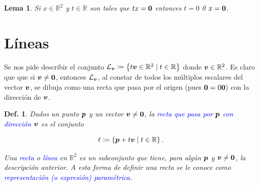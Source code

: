 \documentclass{article}
\theoremstyle{definicion}
\newtheorem{definicion}{Def.}
\theoremstyle{definition}             %
\theoremstyle{definition}             %
\theoremstyle{definition}
\theoremstyle{definition}
\theoremstyle{observacion}
\theoremstyle{definition}
\theoremstyle{plain}
\newtheorem{lemma}{Lema}
\theoremstyle{definition}
\theoremstyle{afirmacion}
\theoremstyle{notation}
\theoremstyle{definition}
\begin{document}
    \begin{lemma}
        Si \(x \in \mathbb{R}^{2}\) y \(t \in \mathbb{R}\) son tales que \(tx = \vb*{0}\) entonces \(t = 0\) 0 \(x = \vb*{0}\).
    \end{lemma}

    \section{Líneas}

    Se nos pide describir el conjunto \(\mathcal{L}_{\vb*{v}} \coloneq \left\lbrace t\vb*{v} \in \mathbb{R}^{2} \mid t \in \mathbb{R}\right\rbrace\) donde \(\vb*{v} \in \mathbb{R}^{2}\). Es claro que que si \(\vb*{v} \neq \vb*{0}\), entonces \(\mathcal{L}_{\vb*{v}}\), al constar de todos los múltiplos escalares del vector \(\vb*{v}\), se dibuja como una recta que pasa por el origen (pues \(\vb*{0} = 0\vb*{0}\)) con la dirección de \(\vb*{v}\).

    \begin{definicion}
            Dados un punto \(\vb*{p}\) y un vector \(\vb*{v} \neq \vb*{0}\), la \textcolor{blue}{recta que pasa por} \(\vb*{p}\) \textcolor{blue}{con dirección} \(\vb*{v}\) es el conjunto

            \begin{equation*}
                \ell \coloneq \left\lbrace \vb*{p} + t\vb*{v} \mid t \in \mathbb{R}\right\rbrace.
            \end{equation*}

            Una \textcolor{blue}{recta} o \textcolor{blue}{línea} en \(\mathbb{R}^{2}\) es un subconjunto que tiene, para algún \(\vb*{p}\) y \(\vb*{v} \neq \vb*{0}\), la descripción anterior.
            A esta forma de definir una recta se le conoce como \textcolor{blue}{representación (o expresión) paramétrica}.
    \end{definicion}
\end{document}
